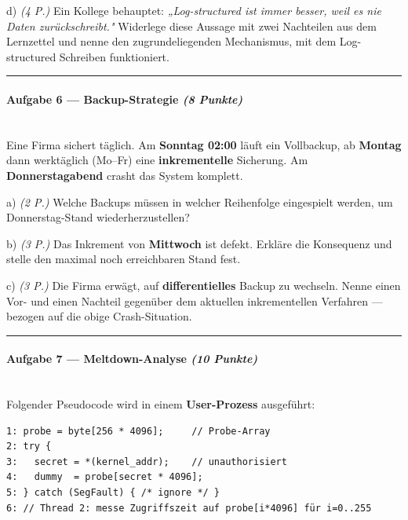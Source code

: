 \documentclass[11pt, a4paper]{article}
\begin{document}
d) \textit{(4 P.)} Ein Kollege behauptet: \textit{„Log-structured ist immer besser, weil es nie Daten zurückschreibt."} Widerlege diese Aussage mit zwei Nachteilen aus dem Lernzettel und nenne den zugrundeliegenden Mechanismus, mit dem Log-structured Schreiben funktioniert.



\noindent\textcolor{rulegray}{\rule{\linewidth}{0.4pt}}


\paragraph{Aufgabe 6 — Backup-Strategie \textit{(8 Punkte)}}\mbox{}\\[2pt]

Eine Firma sichert täglich. Am \textbf{Sonntag 02:00} läuft ein Vollbackup, ab \textbf{Montag} dann werktäglich (Mo–Fr) eine \textbf{inkrementelle} Sicherung. Am \textbf{Donnerstagabend} crasht das System komplett.


a) \textit{(2 P.)} Welche Backups müssen in welcher Reihenfolge eingespielt werden, um Donnerstag-Stand wiederherzustellen?


b) \textit{(3 P.)} Das Inkrement von \textbf{Mittwoch} ist defekt. Erkläre die Konsequenz und stelle den maximal noch erreichbaren Stand fest.


c) \textit{(3 P.)} Die Firma erwägt, auf \textbf{differentielles} Backup zu wechseln. Nenne einen Vor- und einen Nachteil gegenüber dem aktuellen inkrementellen Verfahren — bezogen auf die obige Crash-Situation.



\noindent\textcolor{rulegray}{\rule{\linewidth}{0.4pt}}


\paragraph{Aufgabe 7 — Meltdown-Analyse \textit{(10 Punkte)}}\mbox{}\\[2pt]

Folgender Pseudocode wird in einem \textbf{User-Prozess} ausgeführt:


\begin{lstlisting}
1: probe = byte[256 * 4096];     // Probe-Array
2: try {
3:   secret = *(kernel_addr);    // unauthorisiert
4:   dummy  = probe[secret * 4096];
5: } catch (SegFault) { /* ignore */ }
6: // Thread 2: messe Zugriffszeit auf probe[i*4096] für i=0..255
\end{lstlisting}
\end{document}
